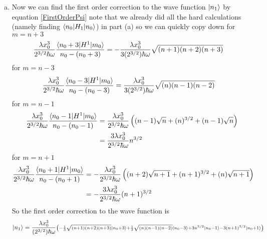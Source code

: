 \documentclass[11pt]{article}
\numberwithin{equation}{section}
\begin{document}
\begin{enumerate}[(a)]
\item
Now we can find the first order correction to the wave function $|{n_1}\rangle$ by equation \ref{FirstOrderPsi} note that we already did all the hard calculations (namely finding $\langle{n_0}|H_1|{n_0}\rangle$) in part (a) so we can quickly copy down for $m=n+3$
\begin{align*}
\frac{\lambda x_0^3}{2^{3/2}\hbar\omega}\frac{\langle{n_0+3}|H^1|{m_0}\rangle}{n_0 - (n_0+3)} &= -\frac{\lambda x_0^3}{3(2^{3/2})\hbar\omega}\sqrt{(n+1)(n+2)(n+3)}
\end{align*}
for $m=n-3$ 
\begin{align*}
\frac{\lambda x_0^3}{2^{3/2}\hbar\omega}\frac{\langle{n_0-3}|H^1|{m_0}\rangle}{n_0 - (n_0-3)} &= \frac{\lambda x_0^3}{3(2^{3/2})\hbar\omega}\sqrt{(n)(n-1)(n-2)}
\end{align*}
for $m=n-1$ 
\begin{align*}
\frac{\lambda x_0^3}{2^{3/2}\hbar\omega}\frac{\langle{n_0-1}|H^1|{m_0}\rangle}{n_0 - (n_0-1)} &= \frac{\lambda x_0^3}{2^{3/2}\hbar\omega}\left((n-1)\sqrt{n} + (n)^{3/2} +(n-1)\sqrt{n}\right)\\
&= \frac{3\lambda x_0^3}{2^{3/2}\hbar\omega}n^{3/2}
\end{align*}
for $m = n+1$
\begin{align*}
\frac{\lambda x_0^3}{2^{3/2}\hbar\omega}\frac{\langle{n_0+1}|H^1|{m_0}\rangle}{n_0 - (n_0+1)} &= -\frac{\lambda x_0^3}{2^{3/2}\hbar\omega}\left((n+2)\sqrt{n+1} + (n+1)^{3/2} + (n)\sqrt{n+1}\right)\\
&= -\frac{3\lambda x_0^3}{2^{3/2}\hbar\omega}(n+1)^{3/2}
\end{align*}
So the first order correction to the wave function is 
$$|{n_1}\rangle = \frac{\lambda x_0^3}{(2^{3/2})\hbar\omega}\scriptstyle{\left(-\frac{1}{3}\sqrt{(n+1)(n+2)(n+3)}|{n_0+3}\rangle + \frac{1}{3}\sqrt{(n)(n-1)(n-2)}|{n_0-3}\rangle + 3n^{3/2}|{n_0-1}\rangle -3(n+1)^{3/2}|{n_0+1}\rangle\right)}$$
\end{enumerate}
\end{document}
